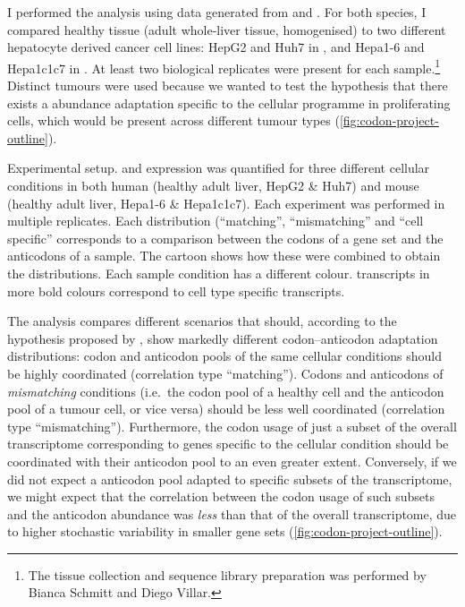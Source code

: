 I performed the analysis using data generated from \mmu and \hsa. For both
species, I compared healthy tissue (adult whole-liver tissue, homogenised) to
two different hepatocyte derived cancer cell lines: HepG2 and Huh7 in \hsa, and
Hepa1-6 and Hepa1c1c7 in \mmu. At least two biological replicates were present
for each sample.\footnote{The tissue collection and sequence library preparation
was performed by Bianca Schmitt and Diego Villar.} Distinct tumours were used
because we wanted to test the hypothesis that there exists a \trna abundance
adaptation specific to the cellular programme in proliferating cells, which
would be present across different tumour types
(\cref{fig:codon-project-outline}).

    {Experimental setup.}
    {\mrna and \trna expression was quantified for three different cellular
    conditions in both human (healthy adult liver, HepG2 \& Huh7) and mouse
    (healthy adult liver, Hepa1-6 \& Hepa1c1c7). Each experiment was performed
    in multiple replicates. Each distribution (“matching”, “mismatching” and
    “cell specific” corresponds to a comparison between the codons of a gene set
    and the anticodons of a sample. The cartoon shows how these were combined to
    obtain the distributions. Each sample condition has a different colour.
    \mrna transcripts in more bold colours correspond to cell type specific
    transcripts.}

The analysis compares different scenarios that should, according to the
hypothesis proposed by \citet{Gingold:2014}, show markedly different
codon--anticodon adaptation distributions: codon and anticodon pools of the same
cellular conditions should be highly coordinated (correlation type “matching”).
Codons and anticodons of \emph{mismatching} conditions (i.e.\ the codon pool of
a healthy cell and the anticodon pool of a tumour cell, or vice versa) should be
less well coordinated (correlation type “mismatching”). Furthermore, the codon
usage of just a subset of the overall transcriptome corresponding to genes
specific to the cellular condition should be coordinated with their anticodon
pool to an even greater extent. Conversely, if we did not expect a \trna
anticodon pool adapted to specific subsets of the transcriptome, we might expect
that the correlation between the codon usage of such subsets and the anticodon
abundance was \emph{less} than that of the overall transcriptome, due to higher
stochastic variability in smaller gene sets (\cref{fig:codon-project-outline}).

